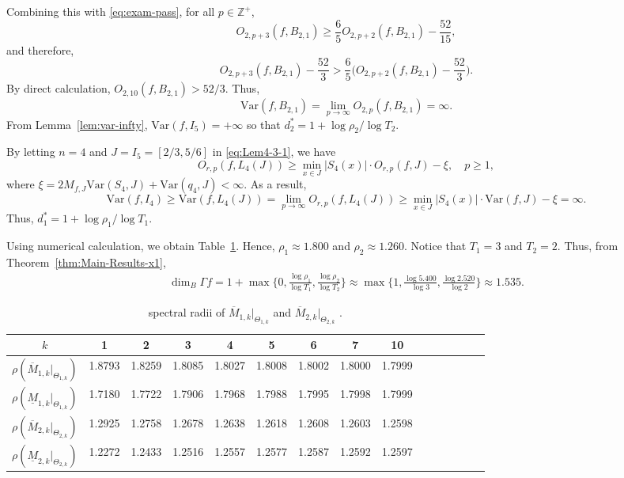 \documentclass[11pt]{amsart}
\theoremstyle{definition}
\theoremstyle{remark}
\numberwithin{equation}{section}
\newcommand{\Z}{{\mathbb Z}}
\newcommand{\upM}{{\overline{M}}}
\newcommand{\lowM}{{\underline{M}}}
\newcommand{\uprho}{{{\rho}}}
\newcommand{\Var}{\mathrm{Var}}
\begin{document}
	
	
	Combining this with \eqref{eq:exam-pass}, for all $p\in \Z^+$,
	\[
	O_{2,p+3}(f,B_{2,1}) \geq   \frac{6}{5} O_{2,p+2}(f,B_{2,1})-\frac{52}{15}, 
	\]
	and therefore,
	\[O_{2,p+3}(f,B_{2,1})-\frac{52}{3} > \frac{6}{5} \Big( O_{2,p+2}(f,B_{2,1})-\frac{52}{3} \Big).\]
	By direct calculation, $O_{2,10}(f,B_{2,1}) > {52}/{3}$. Thus,
	$$\Var(f,B_{2,1})=\lim_{p \to \infty} O_{2,p} (f,B_{2,1})=\infty.$$
	From Lemma~\ref{lem:var-infty}, $\Var(f,I_5)=+\infty$ so that $d_2^*=1+\log \rho_2/\log T_2$.
	
	
	By letting $n=4$ and $J=I_5=[2/3,5/6]$ in \eqref{eq:Lem4-3-1}, we have
	\[
	    O_{r,p}(f,L_4(J)) \geq  \min_{x \in J} |S_4(x)| \cdot  O_{r,p}(f,J)-\xi   , \quad  p \geq 1,
	\]
	where $\xi = 2M_{f,J} \Var(S_4,J)+\Var(q_4,J)<\infty$.
	As a result, 
	\[
	    \Var(f,I_4) \geq \Var(f,L_4(J)) =\lim_{p \to \infty} O_{r,p}(f,L_4(J)) \geq \min_{x \in J} |S_4(x)|  \cdot  \Var(f,J)-\xi  =\infty.
	\]
    Thus, $d_1^*=1+\log \rho_1/\log T_1$.
	
	Using numerical calculation, we obtain Table~\ref{tab:example}.
	Hence, $\rho_1 \approx 1.800$ and $\rho_2 \approx 1.260$.
	Notice that $T_1=3$ and $T_2=2$.
	Thus, from Theorem~\ref{thm:Main-Results-x1}, 
	\begin{align*}
		\dim_B \Gamma f 
		= 1+ \max \Big\{0 , \frac{\log \uprho_1}{\log T_1}, \frac{\log \uprho_2}{\log T_2} \Big\}
		\approx  \max \Big\{1, \frac{\log 5.400}{\log 3}, \frac{\log 2.520}{\log 2} \Big\} 
		\approx  1.535.
	\end{align*}
	
	
	



\begin{table}[h]
\renewcommand\arraystretch{1.5}
\centering
\caption{spectral radii of $\upM_{1,k}|_{\Theta_{1,k}}$ and $\upM_{2,k}|_{\Theta_{2,k}}$ . }
\label{tab:example}
\begin{tabular}{|c|c|c|c|c|c|c|c|c|c|c|c|c|c|c|}
\hline
$k$ & 1 & 2 & 3 & 4 &5 & 6 & 7 & 10 \\ \hline
$\rho (\upM_{1,k}|_{\Theta_{1,k}})$ & 1.8793 & 1.8259 & 1.8085 & 1.8027 & 1.8008 & 1.8002 & 1.8000   & 1.7999 \\ \hline
$\rho (\lowM_{1,k}|_{\Theta_{1,k}})$ & 1.7180 & 1.7722 & 1.7906 & 1.7968 & 1.7988 & 1.7995 & 1.7998  & 1.7999 \\ \hline
$\rho (\upM_{2,k}|_{\Theta_{2,k}})$ & 1.2925 & 1.2758 & 1.2678 & 1.2638 & 1.2618 & 1.2608 & 1.2603  & 1.2598 \\ \hline
$\rho (\lowM_{2,k}|_{\Theta_{2,k}})$ & 1.2272 & 1.2433 & 1.2516 & 1.2557 & 1.2577 & 1.2587 & 1.2592 & 1.2597 \\ \hline
\end{tabular}
\end{table}
\end{document}
